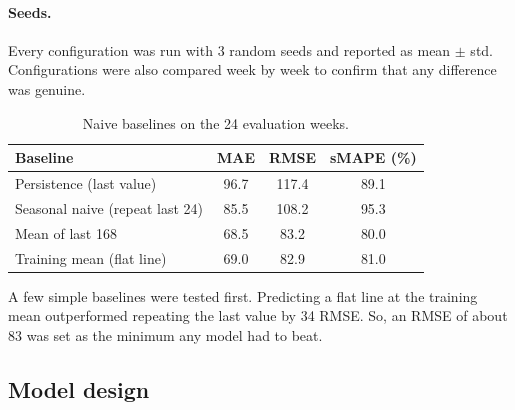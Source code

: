 \documentclass[11pt,a4paper]{article}
\begin{document}
\paragraph{Seeds.} Every configuration was run with 3 random seeds and reported as mean $\pm$ std. Configurations were also compared week by week to confirm that any difference was genuine.

\begin{table}[H]\centering\small
\caption{Naive baselines on the 24 evaluation weeks.}
\label{tab:t2base}
\begin{tabular}{lccc}
\toprule
Baseline & MAE & RMSE & sMAPE (\%)\\
\midrule
Persistence (last value) & 96.7 & 117.4 & 89.1\\
Seasonal naive (repeat last 24) & 85.5 & 108.2 & 95.3\\
Mean of last 168 & 68.5 & 83.2 & 80.0\\
Training mean (flat line) & 69.0 & 82.9 & 81.0\\
\bottomrule
\end{tabular}
\end{table}

A few simple baselines were tested first. Predicting a flat line at the training mean outperformed repeating the last value by 34 RMSE. So, an RMSE of about 83 was set as the minimum any model had to beat.

\subsection*{Model design}
\end{document}
